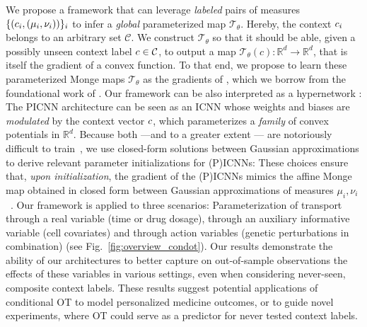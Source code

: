 We propose a framework that can leverage \textit{labeled} pairs of measures $\{(c_i, (\mu_i, \nu_i))\}_i$ to infer a \textit{global} parameterized map $\mathcal{T}_{\theta}$. 
Hereby, the context $c_i$ belongs to an arbitrary set $\mathcal{C}$. We construct $\mathcal{T}_{\theta}$ so that it should be able, given a possibly unseen context label $c\in{\mathcal{C}}$, to output a map $\mathcal{T}_{\theta}(c):\mathbb{R}^d\rightarrow\mathbb{R}^d$, that is itself the gradient of a convex function. To that end, we propose to learn these parameterized Monge maps $\mathcal{T}_{\theta}$ as the gradients of , which we borrow from the foundational work of \citet{amos2017input}. 
%
Our framework can be also interpreted as a hypernetwork \citep{ha2016hypernetworks}: The \acrshort{PICNN} architecture can be seen as an \acrshort{ICNN} whose weights and biases are \textit{modulated} by the context vector $c$, which parameterizes a \textit{family} of convex potentials in $\mathbb{R}^d$.
%
Because both  ---and to a greater extent --- are notoriously difficult to train~\citep{richter2021input,korotin2021wasserstein,korotin2021neural}, we use closed-form solutions between Gaussian approximations to derive relevant parameter initializations for (P)ICNNs:
These choices ensure that, \textit{upon initialization}, the gradient of the (P)ICNNs mimics the affine Monge map obtained in closed form between Gaussian approximations of measures $\mu_i,\nu_i$~\citep{gelbrich1990formula}.
%
Our framework is applied to three scenarios: Parameterization of transport through a real variable (time or drug dosage), through an auxiliary informative variable (cell covariates) and through action variables (genetic perturbations in combination) (see Fig.~\ref{fig:overview_condot}). Our results demonstrate the ability of our architectures to better capture on out-of-sample observations the effects of these variables in various settings, even when considering never-seen, composite context labels. These results suggest potential applications of conditional OT to model personalized medicine outcomes, or to guide novel experiments, where OT could serve as a predictor for never tested context labels.


